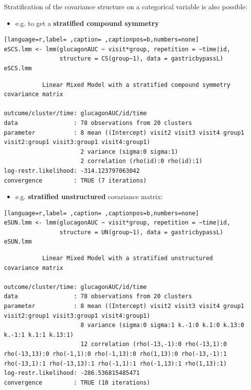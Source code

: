\documentclass[12pt]{article}
\begin{document}
\noindent Stratification of the covariance structure on a categorical
variable is also possible:
\begin{itemize}
\item e.g. to get a \textbf{stratified compound symmetry}
\end{itemize}
\begin{lstlisting}[language=r,label= ,caption= ,captionpos=b,numbers=none]
eSCS.lmm <- lmm(glucagonAUC ~ visit*group, repetition = ~time|id,
                structure = CS(group~1), data = gastricbypassL)
eSCS.lmm
\end{lstlisting}

\begin{verbatim}
	       Linear Mixed Model with a stratified compound symmetry covariance matrix 

outcome/cluster/time: glucagonAUC/id/time 
data                : 78 observations from 20 clusters 
parameter           : 8 mean ((Intercept) visit2 visit3 visit4 group1 visit2:group1 visit3:group1 visit4:group1) 
                      2 variance (sigma:0 sigma:1) 
                      2 correlation (rho(id):0 rho(id):1) 
log-restr.likelihood: -314.123797063042 
convergence         : TRUE (7 iterations)
\end{verbatim}


\clearpage

\begin{itemize}
\item e.g. \textbf{stratified unstructured} covariance matrix:
\end{itemize}
\begin{lstlisting}[language=r,label= ,caption= ,captionpos=b,numbers=none]
eSUN.lmm <- lmm(glucagonAUC ~ visit*group, repetition = ~time|id,
                structure = UN(group~1), data = gastricbypassL)
eSUN.lmm
\end{lstlisting}
\begin{verbatim}
	       Linear Mixed Model with a stratified unstructured covariance matrix 

outcome/cluster/time: glucagonAUC/id/time 
data                : 78 observations from 20 clusters 
parameter           : 8 mean ((Intercept) visit2 visit3 visit4 group1 visit2:group1 visit3:group1 visit4:group1) 
                      8 variance (sigma:0 sigma:1 k.-1:0 k.1:0 k.13:0 k.-1:1 k.1:1 k.13:1) 
                      12 correlation (rho(-13,-1):0 rho(-13,1):0 rho(-13,13):0 rho(-1,1):0 rho(-1,13):0 rho(1,13):0 rho(-13,-1):1 rho(-13,1):1 rho(-13,13):1 rho(-1,1):1 rho(-1,13):1 rho(1,13):1) 
log-restr.likelihood: -286.536815485471 
convergence         : TRUE (10 iterations)
\end{verbatim}
\end{document}
